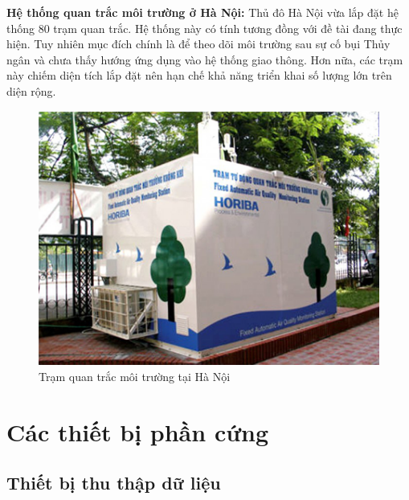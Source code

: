 \textbf{Hệ thống quan trắc môi trường ở Hà Nội:} Thủ đô Hà Nội vừa lắp đặt hệ thống 80 trạm quan trắc. Hệ thống này có tính tương đồng với đề tài đang thực hiện. Tuy nhiên mục đích chính là để theo dõi môi trường sau sự cố bụi Thủy ngân và chưa thấy hướng ứng dụng vào hệ thống giao thông. Hơn nữa, các trạm này chiếm diện tích lắp đặt nên hạn chế khả năng triển khai số lượng lớn trên diện rộng.
\begin{figure}[htbp!] 
\centering    
\includegraphics[width=1.0\textwidth]{pic3}
\caption[Trạm quan trắc môi trường tại Hà Nội ]{Trạm quan trắc môi trường tại Hà Nội}
\label{fig:pic3}
\end{figure}

\section{Các thiết bị phần cứng}
\subsection{Thiết bị thu thập dữ liệu}





